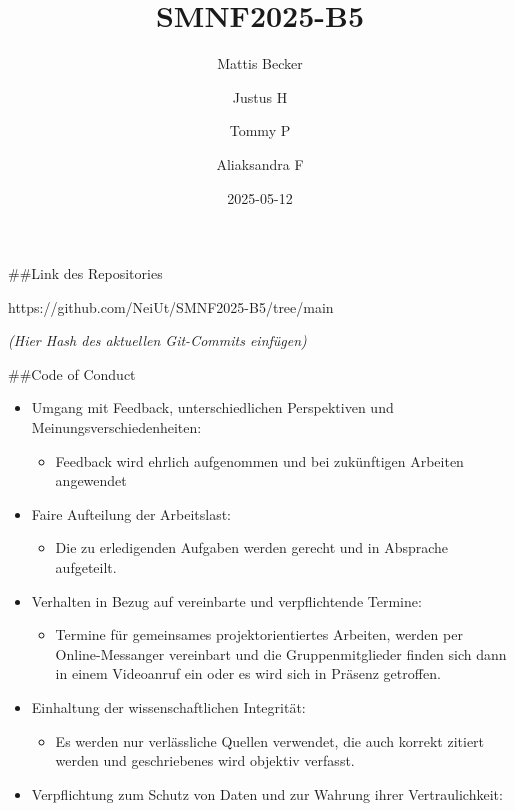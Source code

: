 \documentclass[
  12pt,
  a4paper,
]{article}
\title{SMNF2025-B5}
\author{Mattis Becker \and Justus H \and Tommy P \and Aliaksandra F}
\date{2025-05-12}
\providecommand{\tightlist}{%
  \setlength{\itemsep}{0pt}\setlength{\parskip}{0pt}}\usepackage{longtable,booktabs,array}
\renewcommand*\contentsname{Table of contents}
\newcommand\contentsname{Table of contents}
\begin{document}
\maketitle

\renewcommand*\contentsname{Table of contents}
{
\hypersetup{linkcolor=}
\setcounter{tocdepth}{3}
\tableofcontents
}

\#\#Link des Repositories

https://github.com/NeiUt/SMNF2025-B5/tree/main

\emph{(Hier Hash des aktuellen Git-Commits einfügen)}

\#\#Code of Conduct

\begin{itemize}
\item
  Umgang mit Feedback, unterschiedlichen Perspektiven und
  Meinungsverschiedenheiten:

  \begin{itemize}
  \tightlist
  \item
    Feedback wird ehrlich aufgenommen und bei zukünftigen Arbeiten
    angewendet
  \end{itemize}
\item
  Faire Aufteilung der Arbeitslast:

  \begin{itemize}
  \tightlist
  \item
    Die zu erledigenden Aufgaben werden gerecht und in Absprache
    aufgeteilt.
  \end{itemize}
\item
  Verhalten in Bezug auf vereinbarte und verpflichtende Termine:

  \begin{itemize}
  \tightlist
  \item
    Termine für gemeinsames projektorientiertes Arbeiten, werden per
    Online-Messanger vereinbart und die Gruppenmitglieder finden sich
    dann in einem Videoanruf ein oder es wird sich in Präsenz getroffen.
  \end{itemize}
\item
  Einhaltung der wissenschaftlichen Integrität:

  \begin{itemize}
  \tightlist
  \item
    Es werden nur verlässliche Quellen verwendet, die auch korrekt
    zitiert werden und geschriebenes wird objektiv verfasst.
  \end{itemize}
\item
  Verpflichtung zum Schutz von Daten und zur Wahrung ihrer
  Vertraulichkeit:


\end{itemize}
\end{document}
